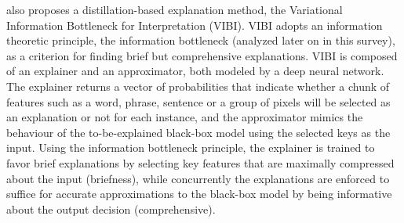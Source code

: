 \documentclass[journal]{IEEEtran}
\begin{document}
\cite{Bang2019} also proposes a distillation-based explanation method, the Variational Information Bottleneck for Interpretation (VIBI). VIBI adopts an information theoretic principle, the information bottleneck (analyzed later on in this survey), as a criterion for finding brief but comprehensive explanations. VIBI is composed of an explainer and an approximator, both modeled by a deep neural network. The explainer returns a vector of probabilities that indicate whether a chunk of features such as a word, phrase, sentence or a group of pixels will be selected as an explanation or not for each instance, and the approximator mimics the behaviour of the to-be-explained black-box model using the selected keys as the input. Using the information bottleneck principle, the explainer is trained to favor brief explanations by selecting key features that are maximally compressed about the input (briefness), while concurrently the explanations are enforced to suffice for accurate approximations to the black-box model by being informative about the output decision (comprehensive). 
\end{document}

